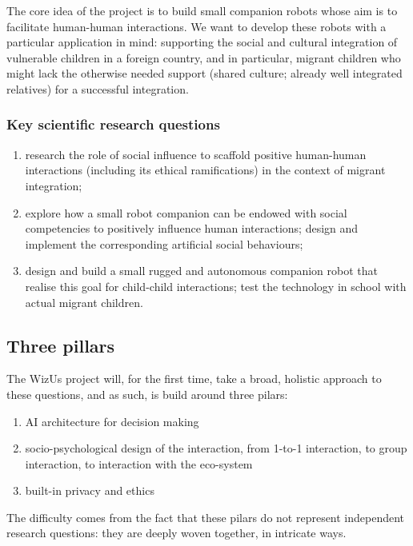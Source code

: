 \documentclass[11pt,a4paper]{report}
\newcommand{\project}{WizUs\xspace}
\begin{document}
The core idea of the project is to build small companion robots whose
aim is to facilitate human-human interactions. We want to develop these
robots with a particular application in mind: supporting the social and
cultural integration of vulnerable children in a foreign country, and in
particular, migrant children who might lack the otherwise needed support
(shared culture; already well integrated relatives) for a successful
integration.

\subsubsection{Key scientific research questions}

\begin{enumerate}
\item research the role of social influence to scaffold positive human-human
    interactions (including its ethical ramifications) in the context of migrant
    integration;
\item explore how a small robot companion can be endowed with social
    competencies to positively influence human interactions; design and
    implement the corresponding artificial social behaviours;
\item design and build a small rugged and autonomous companion robot that
    realise this goal for child-child interactions; test the technology in
    school with actual migrant children.
\end{enumerate}


\subsection{Three pillars}

The \project project will, for the first time, take a broad, holistic approach
to these questions, and as such, is build around three pilars:

\begin{enumerate}
    \item AI architecture for decision making
    \item socio-psychological design of the interaction, from 1-to-1
        interaction, to group interaction, to interaction with the eco-system
    \item built-in privacy and ethics
\end{enumerate}

The difficulty comes from the fact that these pilars do not represent independent
research questions: they are deeply woven together, in intricate ways.
\end{document}
